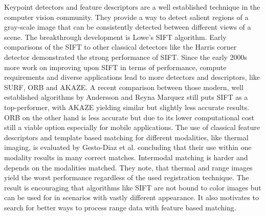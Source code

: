 Keypoint detectors and feature descriptors are a well established technique in the computer vision community.
They provide a way to detect salient regions of a gray-scale image that can be consistently detected between different views of a scene.
The breakthrough development is Lowe's SIFT\cite{lowe_ijcv04} algorithm.
Early comparisons\cite{mikolajczyk_pami2005} of the SIFT to other classical detectors like the Harris corner detector\cite{harris_1988} demonstrated the strong performance of SIFT.
Since the early 2000s more work on improving upon SIFT in terms of performance, compute requirements and diverse applications lead to more detectors and descriptors, like SURF\cite{bay_eccv06}, ORB\cite{rublee_iccv11} and AKAZE\cite{alcantarilla_bmva13}.
A recent comparison between those modern, well established algorithms by Andersson and Reyna Marquez\cite{andersson_2016} still puts SIFT as a top-performer, with AKAZE\cite{alcantarilla_bmva13} yielding similar but slightly less accurate results.
ORB\cite{rublee_iccv11} on the other hand is less accurate but due to its lower computational cost still a viable option especially for mobile applications.
The use of classical feature descriptors and template based matching for different modalities, like thermal imaging, is evaluated by Gesto-Diaz et al.\cite{gesto-diaz_2017} concluding that their use within one modality results in many correct matches.
Intermodal matching is harder and depends on the modalities matched.
They note, that thermal and range images yield the worst performance regardless of the used registration technique.
The result is encouraging that algorithms like SIFT\cite{lowe_ijcv04} are not bound to color images but can be used for in scenarios with vastly different appearance.
It also motivates to search for better ways to process range data with feature based matching.
